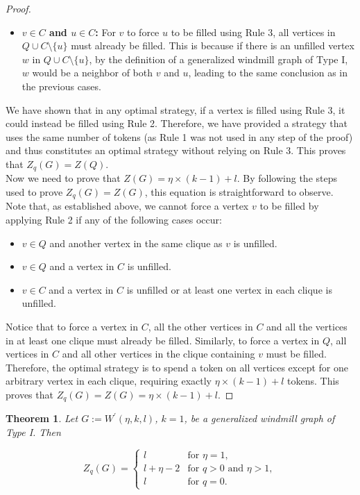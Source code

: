 \documentclass[11pt]{article}
\theoremstyle{plain}
\newtheorem{theorem}{Theorem}[section]
\theoremstyle{definition}
\theoremstyle{remark}
\begin{document}
\begin{proof}
\begin{itemize}
        \item \textbf{$v \in C$ and $u \in C$:} For $ v $ to force $ u $ to be filled using Rule 3, all vertices in $ Q \cup C \setminus \{u\} $ must already be filled. This is because if there is an unfilled vertex $ w $ in $ Q \cup C \setminus \{u\} $, by the definition of a generalized windmill graph of Type I, $ w $ would be a neighbor of both $ v $ and $ u $, leading to the same conclusion as in the previous cases.
    \end{itemize}

    We have shown that in any optimal strategy, if a vertex is filled using Rule 3, it could instead be filled using Rule 2. Therefore, we have provided a strategy that uses the same number of tokens (as Rule 1 was not used in any step of the proof) and thus constitutes an optimal strategy without relying on Rule 3. This proves that $Z_q(G) = Z(Q)$.
    \\

    Now we need to prove that $ Z(G) = \eta \times (k-1) + l $. By following the steps used to prove $ Z_q(G) = Z(G) $, this equation is straightforward to observe. Note that, as established above, we cannot force a vertex $ v $ to be filled by applying Rule 2 if any of the following cases occur:

    \begin{itemize}
        \item $ v \in Q $ and another vertex in the same clique as $ v $ is unfilled.
        \item $ v \in Q $ and a vertex in $ C $ is unfilled.
        \item $ v \in C $ and a vertex in $ C $ is unfilled or at least one vertex in each clique is unfilled.
    \end{itemize}

    Notice that to force a vertex in $ C $, all the other vertices in $C$ and all the vertices in at least one clique must already be filled. Similarly, to force a vertex in $ Q $, all vertices in $ C $ and all other vertices in the clique containing $ v $ must be filled. Therefore, the optimal strategy is to spend a token on all vertices except for one arbitrary vertex in each clique, requiring exactly $ \eta \times (k-1) + l $ tokens. This proves that $ Z_q(G) = Z(G) = \eta \times (k-1) + l $.
\end{proof}



\begin{theorem} \label{Theorem: windmill edge case}
    Let $ G := W^{\prime}(\eta, k, l) $, $k = 1$, be a generalized windmill graph of Type I. Then

    $$Z_q(G) = 
    \begin{cases}
        l & \text{for } \eta = 1, \\
        l + \eta - 2 & \text{for } q > 0 \text{ and } \eta > 1, \\
        l & \text{for } q = 0.
    \end{cases}$$
\end{theorem}
\end{document}
